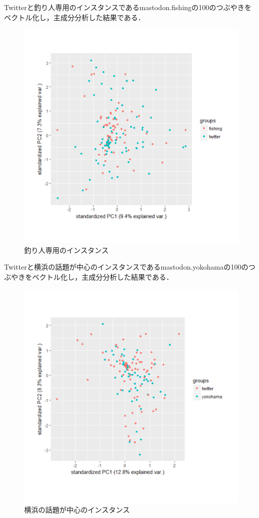 Twitterと釣り人専用のインスタンスであるmastodon.fishingの100のつぶやきをベクトル化し，主成分分析した結果である．
\begin{figure}[h]
\centering
\includegraphics[width=13cm,clip]{fishing.pdf}
\caption{釣り人専用のインスタンス}\label{fishing}
\end{figure}
\newpage

Twitterと横浜の話題が中心のインスタンスであるmastodon.yokohamaの100のつぶやきをベクトル化し，主成分分析した結果である．
\begin{figure}[h]
\centering
\includegraphics[width=13cm,clip]{yokohama.pdf}
\caption{横浜の話題が中心のインスタンス}\label{yokohama}
\end{figure}
\newpage

